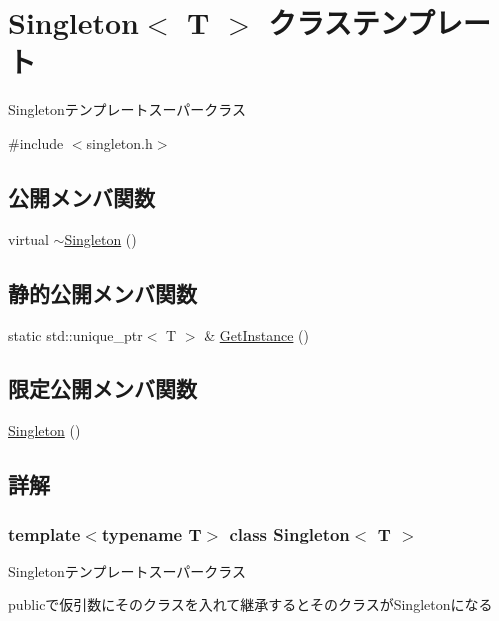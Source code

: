 \hypertarget{class_singleton}{}\section{Singleton$<$ T $>$ クラステンプレート}
\label{class_singleton}


Singletonテンプレートスーパークラス  




{\ttfamily \#include $<$singleton.\+h$>$}

\subsection*{公開メンバ関数}
\begin{DoxyCompactItemize}
\item 
virtual \mbox{\hyperlink{class_singleton_ad3c93143836479fb3dd96b21b795938c}{$\sim$\+Singleton}} ()
\end{DoxyCompactItemize}
\subsection*{静的公開メンバ関数}
\begin{DoxyCompactItemize}
\item 
static std\+::unique\+\_\+ptr$<$ T $>$ \& \mbox{\hyperlink{class_singleton_a57b10e4aa6d89bbac3a16355914655b3}{Get\+Instance}} ()
\end{DoxyCompactItemize}
\subsection*{限定公開メンバ関数}
\begin{DoxyCompactItemize}
\item 
\mbox{\hyperlink{class_singleton_a923b995920da9c06590adb170ab2f890}{Singleton}} ()
\end{DoxyCompactItemize}


\subsection{詳解}
\subsubsection*{template$<$typename T$>$\newline
class Singleton$<$ T $>$}

Singletonテンプレートスーパークラス 

publicで仮引数にそのクラスを入れて継承するとそのクラスが\+Singletonになる 

